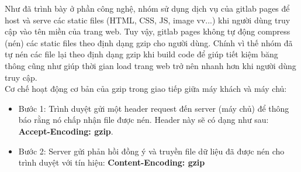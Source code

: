			Như đã trình bày ở phần công nghệ, nhóm sử dụng dịch vụ của gitlab pages để host và serve các static files (HTML, CSS, JS, image vv...) khi người dùng truy cập vào tên miền của trang web. Tuy vậy, gitlab pages không tự động compress (nén) các static files theo định dạng gzip cho người dùng. Chính vì thế nhóm đã tự nén các file lại theo định dạng gzip khi build code để giúp tiết kiệm băng thông cũng như giúp thời gian load trang web trở nên nhanh hơn khi người dùng truy cập.\\
			
			Cơ chế hoạt động cơ bản của gzip trong giao tiếp giữa máy khách và máy chủ:
			\begin{itemize}
				\item Bước 1: Trình duyệt gửi một header request đến server (máy chủ) để thông báo rằng nó chấp nhận file được nén. Header này sẽ có dạng như sau: \textbf{Accept-Encoding: gzip}.
				\item Bước 2: Server gửi phản hồi đồng ý và truyền file dữ liệu đã được nén cho trình duyệt với tín hiệu: \textbf{Content-Encoding: gzip}
			\end{itemize}
			